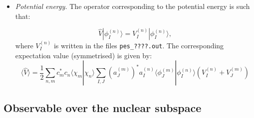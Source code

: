 \begin{itemize}
    \item \textit{Potential energy.} The operator corresponding to the potential energy is such that:
    
    \begin{equation}
        \hat V |\phi_I^{(n)}\rangle = V_I^{(n)}|\phi_I^{(n)}\rangle,
    \end{equation}
    where $V_I^{(n)}$ is written in the files \verb+pes_????.out+. The corresponding expectation value (symmetrised) is given by:
    \begin{equation}
        \langle\hat V\rangle = \frac{1}{2}\sum_{n,m}c_m^*c_n\langle\chi_m|\chi_n\rangle\sum_{I,J}\left(a_J^{(m)}\right)^*a_I^{(n)}\langle\phi_J^{(m)}|\phi_I^{(n)}\rangle\left(V_I^{(n)}+V_J^{(m)}\right)
    \end{equation}
    
\end{itemize}

\subsection{Observable over the nuclear subspace}

